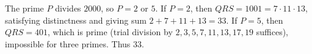 The prime $P$ divides $2000$, so $P=2$ or $5$. If $P=2$, then $QRS=1001=7\cdot11\cdot13$, satisfying distinctness and giving sum $2+7+11+13=33$. If $P=5$, then $QRS=401$, which is prime (trial division by $2,3,5,7,11,13,17,19$ suffices), impossible for three primes. Thus $\boxed{33}$.
